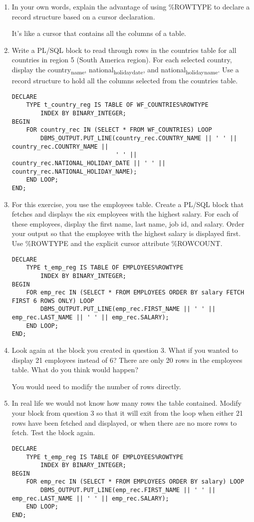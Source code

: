 \documentclass[11pt]{article}
\begin{document}
\begin{enumerate}
\item In your own words, explain the advantage of using \%ROWTYPE to declare a record structure based on a cursor declaration.

It's like a cursor that contains all the columns of a table.

\item Write a PL/SQL block to read through rows in the countries table for all countries in region 5 (South America region). For each selected country, display the country\textsubscript{name}, national\textsubscript{holiday}\textsubscript{date}, and national\textsubscript{holiday}\textsubscript{name}. Use a record structure to hold all the columns selected from the countries table.
\begin{verbatim}
DECLARE
    TYPE t_country_reg IS TABLE OF WF_COUNTRIES%ROWTYPE
        INDEX BY BINARY_INTEGER;
BEGIN
    FOR country_rec IN (SELECT * FROM WF_COUNTRIES) LOOP
        DBMS_OUTPUT.PUT_LINE(country_rec.COUNTRY_NAME || ' ' || country_rec.COUNTRY_NAME ||
                             ' ' || country_rec.NATIONAL_HOLIDAY_DATE || ' ' || country_rec.NATIONAL_HOLIDAY_NAME);
    END LOOP;
END;
\end{verbatim}

\item For this exercise, you use the employees table. Create a PL/SQL block that fetches and displays the six employees with the highest salary. For each of these employees, display the first name, last name, job id, and salary. Order your output so that the employee with the highest salary is displayed first. Use \%ROWTYPE and the explicit cursor attribute \%ROWCOUNT.
\begin{verbatim}
DECLARE
    TYPE t_emp_reg IS TABLE OF EMPLOYEES%ROWTYPE
        INDEX BY BINARY_INTEGER;
BEGIN
    FOR emp_rec IN (SELECT * FROM EMPLOYEES ORDER BY salary FETCH FIRST 6 ROWS ONLY) LOOP
        DBMS_OUTPUT.PUT_LINE(emp_rec.FIRST_NAME || ' ' || emp_rec.LAST_NAME || ' ' || emp_rec.SALARY);
    END LOOP;
END;
\end{verbatim}

\item Look again at the block you created in question 3. What if you wanted to display 21 employees instead of 6? There are only 20 rows in the employees table. What do you think would happen?

You would need to modify the number of rows directly.

\item In real life we would not know how many rows the table contained. Modify your block from question 3 so that it will exit from the loop when either 21 rows have been fetched and displayed, or when there are no more rows to fetch. Test the block again.
\begin{verbatim}
DECLARE
    TYPE t_emp_reg IS TABLE OF EMPLOYEES%ROWTYPE
        INDEX BY BINARY_INTEGER;
BEGIN
    FOR emp_rec IN (SELECT * FROM EMPLOYEES ORDER BY salary) LOOP
        DBMS_OUTPUT.PUT_LINE(emp_rec.FIRST_NAME || ' ' || emp_rec.LAST_NAME || ' ' || emp_rec.SALARY);
    END LOOP;
END;
\end{verbatim}
\end{enumerate}
\end{document}
